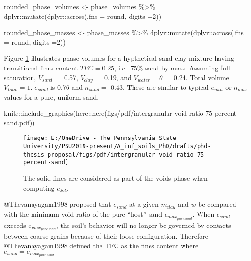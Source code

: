\documentclass[
]{article}
\newenvironment{Shaded}{\begin{snugshade}}{\end{snugshade}}
\newcommand{\AttributeTok}[1]{\textcolor[rgb]{0.77,0.63,0.00}{#1}}
\newcommand{\DecValTok}[1]{\textcolor[rgb]{0.00,0.00,0.81}{#1}}
\newcommand{\FunctionTok}[1]{\textcolor[rgb]{0.00,0.00,0.00}{#1}}
\newcommand{\NormalTok}[1]{#1}
\newcommand{\OtherTok}[1]{\textcolor[rgb]{0.56,0.35,0.01}{#1}}
\newcommand{\SpecialCharTok}[1]{\textcolor[rgb]{0.00,0.00,0.00}{#1}}
\newcommand{\StringTok}[1]{\textcolor[rgb]{0.31,0.60,0.02}{#1}}
\begin{document}
\begin{Shaded}
\begin{Highlighting}[]
\NormalTok{rounded\_phase\_volumes }\OtherTok{\textless{}{-}}\NormalTok{ phase\_volumes }\SpecialCharTok{\%\textgreater{}\%}
\NormalTok{  dplyr}\SpecialCharTok{::}\FunctionTok{mutate}\NormalTok{(dplyr}\SpecialCharTok{::}\FunctionTok{across}\NormalTok{(}\AttributeTok{.fns =}\NormalTok{ round, }\AttributeTok{digits =}\DecValTok{2}\NormalTok{))}


\NormalTok{rounded\_phase\_masses }\OtherTok{\textless{}{-}}\NormalTok{ phase\_masses }\SpecialCharTok{\%\textgreater{}\%}
\NormalTok{  dplyr}\SpecialCharTok{::}\FunctionTok{mutate}\NormalTok{(dplyr}\SpecialCharTok{::}\FunctionTok{across}\NormalTok{(}\AttributeTok{.fns =}\NormalTok{ round, }\AttributeTok{digits =}\DecValTok{2}\NormalTok{))}
\end{Highlighting}
\end{Shaded}

Figure \ref{fig:intergranular-void-ratio-diagram} illustrates phase volumes for a hypthetical sand-clay mixture having transitional fines content \(TFC=0.25\), i.e.~75\% sand by mass.
Assuming full saturation, \(V_{sand}=\) 0.57, \(V_{clay}=\) 0.19, and \(V_{water}=\theta=\) 0.24. Total volume \(V_{total}=1\). \(e_{sand}\) is 0.76 and \(n_{sand}=\) 0.43.
These are similar to typical \(e_{min}\) or \(n_{max}\) values for a pure, uniform sand.

\begin{Shaded}
\begin{Highlighting}[]
\NormalTok{knitr}\SpecialCharTok{::}\FunctionTok{include\_graphics}\NormalTok{(here}\SpecialCharTok{::}\FunctionTok{here}\NormalTok{(}\StringTok{\textquotesingle{}figs/pdf/intergranular{-}void{-}ratio{-}75{-}percent{-}sand.pdf\textquotesingle{}}\NormalTok{))}
\end{Highlighting}
\end{Shaded}

\begin{figure}[hptb]
\texttt{[image: E:/OneDrive - The Pennsylvania State University/PSU2019-present/A\_inf\_soils\_PhD/drafts/phd-thesis-proposal/figs/pdf/intergranular-void-ratio-75-percent-sand]} \caption[Intergranular void ratio of a sand-clay mixture.]{The solid fines are considered as part of the voids phase when computing $e_{SA}$.}\label{fig:intergranular-void-ratio-diagram}
\end{figure}

@Thevanayagam1998 proposed that \(e_{sand}\) at a given \(m_{clay}\) and \(w\) be compared with the minimum void ratio of the pure ``host'' sand \(e_{max_{pure~sand}}\).
When \(e_{sand}\) exceeds \(e_{max_{pure~sand}}\), the soil's behavior will no longer be governed by contacts between coarse grains because of their loose configuration.
Therefore @Thevanayagam1998 defined the TFC as the fines content where \(e_{sand}=e_{max_{pure~sand}}\)
\end{document}
